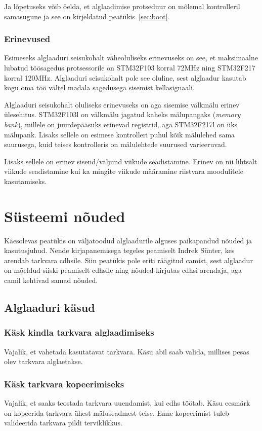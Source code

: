 \documentclass[12pt,a4paper]{article}
\begin{document}
Ja lõpetuseks võib öelda, et alglaadimise protseduur on mõlemal kontrolleril
samasugune ja see on kirjeldatud peatükis~\ref{sec:boot}.

\subsubsection{Erinevused}
Esimeseks alglaaduri seisukohalt väheoluliseks erinevuseks on see, et
maksimaalne lubatud töösagedus protsessorile on STM32F103 korral 72MHz ning
STM32F217 korral 120MHz. Alglaaduri seisukohalt pole see oluline, sest alglaadur
kasutab kogu oma töö vältel madala sagedusega sisemist kellasignaali.

Alglaaduri seisukohalt oluliseks erinevuseks on aga sisemise välkmälu erinev
ülesehitus. STM32F103l on välkmälu jagatud kaheks mälupangaks (\textit{memory
bank}), millele on juurdepääsuks erinevad registrid, aga STM32F217l on üks
mälupank. Lisaks sellele on esimese kontrolleri puhul kõik mälulehed sama
suurusega, kuid teises kontrolleris on mälulehtede suurused varieeruvad.
\cite{f1fpm,f2fpm}

Lisaks sellele on erinev sisend/väljund viikude seadistamine. Erinev on nii
lihtsalt viikude seadistamine kui ka mingite viikude määramine riistvara
moodulitele kasutamiseks.

\section{Süsteemi nõuded}
Käesolevas peatükis on väljatoodud alglaadurile alguses paikapandud nõuded ja
kasutusjuhud. Nende kirjapanemisega tegeles peamiselt Indrek Sünter, kes arendab
tarkvara \gls{cdhs}ile. Siin peatükis pole eriti räägitud \gls{cam}ist, sest
alglaadur on mõeldud siiski peamiselt \gls{cdhs}ile ning nõuded kirjutas
\gls{cdhs}i arendaja, aga \gls{cam}il kehtivad samad nõuded.
\subsection{Alglaaduri käsud}
\subsubsection{Käsk kindla tarkvara alglaadimiseks}
Vajalik, et vahetada kasutatavat tarkvara. Käsu abil saab valida, millises pesas
olev tarkvara alglaetakse.

\subsubsection{Käsk tarkvara kopeerimiseks}
Vajalik, et saaks teostada tarkvara uuendamist, kui \gls{cdhs} töötab. Käsu
eesmärk on kopeerida tarkvara ühest mäluseadmest teise. Enne kopeerimist tuleb
valideerida tarkvara pildi terviklikkus.
\end{document}
